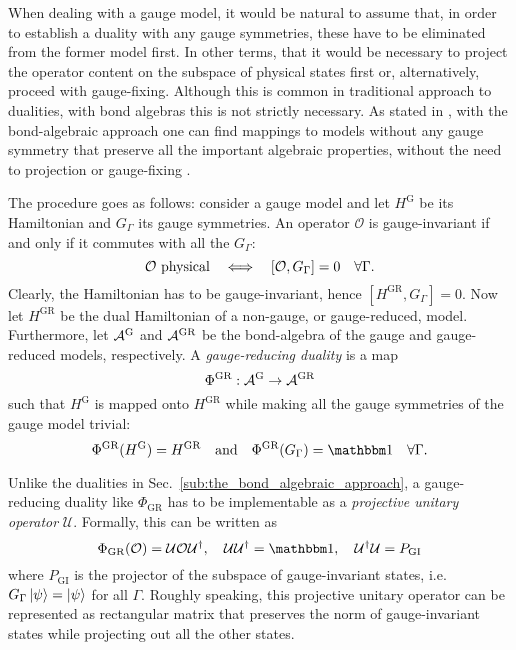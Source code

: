 When dealing with a gauge model, it would be natural to assume that, in order to establish a duality with any gauge symmetries, these have to be eliminated from the former model first.
In other terms, that it would be necessary to project the operator content on the subspace of physical states first or, alternatively, proceed with gauge-fixing.
Although this is common in traditional approach to dualities, with bond algebras this is not strictly necessary.
As stated in \cite{cobanera2011bond}, with the bond-algebraic approach one can find mappings to models without any gauge symmetry that preserve all the important algebraic properties, without the need to projection or gauge-fixing .

The procedure goes as follows: consider a gauge model and let $H^{\text{G}}$ be its Hamiltonian and $G_{\Gamma}$ its gauge symmetries.
An operator $\mathcal{O}$ is gauge-invariant if and only if it commutes with all the $G_{\Gamma}$:\begin{equation*}
    \mathcal{O} \text{~physical}
    \quad \Longleftrightarrow \quad
    \comm{\mathcal{O}}{G_{\Gamma}} = 0 \quad \forall \Gamma.
\end{equation*}
Clearly, the Hamiltonian has to be gauge-invariant, hence $[H^{\text{GR}}, G_{\Gamma}] = 0$.
Now let $H^{\text{GR}}$ be the dual Hamiltonian of a non-gauge, or gauge-reduced, model.
Furthermore, let $\mathcal{A}^{\text{G}}$ and $\mathcal{A}^{\text{GR}}$ be the bond-algebra of the gauge and gauge-reduced models, respectively.
A \emph{gauge-reducing duality} is a map
\begin{equation*}
    \Phi^{\text{GR}} : \mathcal{A}^{\text{G}} \to \mathcal{A}^{\text{GR}}
\end{equation*}
such that $H^{\text{G}}$ is mapped onto $H^{\text{GR}}$ while making all the gauge symmetries of the gauge model trivial:
\begin{equation}
    \Phi^{\text{GR}}(H^{\text{G}}) = H^{\text{GR}}
    \qand
    \Phi^{\text{GR}}(G_{\Gamma}) = \identity \quad \forall \Gamma.
\end{equation}

Unlike the dualities in Sec.~\ref{sub:the_bond_algebraic_approach}, a gauge-reducing duality like $\Phi_{\text{GR}}$ has to be implementable as a \emph{projective unitary operator} $\mathcal{U}$.
Formally, this can be written as
\begin{equation}
    \Phi_{\text{GR}} ( \mathcal{O} ) = \mathcal{U} \mathcal{O} \mathcal{U}^\dagger, \quad
    \mathcal{U} \mathcal{U}^\dagger = \identity, \quad
    \mathcal{U}^\dagger \mathcal{U} = P_{\text{GI}}
\end{equation}
where $P_{\text{GI}}$ is the projector of the subspace of gauge-invariant states, i.e.~$G_{\Gamma} \ket{\psi} = \ket{\psi}$ for all $\Gamma$.
Roughly speaking, this projective unitary operator can be represented as rectangular matrix that preserves the norm of gauge-invariant states while projecting out all the other states.

